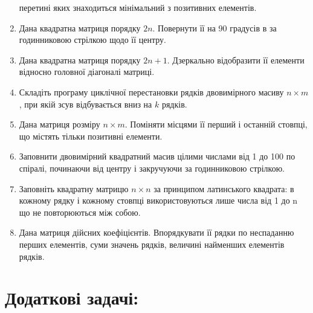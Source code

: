 \documentclass[a5paper,titlepage,openany,twoside,
]
{book_unv}%
\begin{document}
\begin{enumerate}
  перетині яких знаходиться мінімальний з позитивних елементів.
\item
  Дана квадратна матриця порядку $2n$. Повернути її на 90 градусів в
  за годинниковою стрілкою щодо її центру.
\item
  Дана квадратна матриця порядку $2n + 1$. Дзеркально відобразити її
  елементи відносно головної діагоналі матриці.
\item
  Складіть програму циклічної перестановки рядків двовимірного масиву $n \times m$,
  при якій зсув відбувається вниз на $k$ рядків.
\item
  Дана матриця розміру $n \times m$. Поміняти місцями її перший і останній
  стовпці, що містять тільки позитивні елементи.
\item
  Заповнити двовимірний квадратний масив цілими числами від 1 до 100 по
  спіралі, починаючи від центру і закручуючи за годинниковою стрілкою.
\item
  Заповніть квадратну матрицю $n \times n$ за принципом латинського квадрата: в
  кожному рядку і кожному стовпці використовуються лише числа від 1 до n
  що не повторюються між собою.
\item
  Дана матриця дійсних коефіцієнтів. Впорядкувати її рядки по неспаданню
  перших елементів, суми значень рядків, величині найменших елементів
  рядків.
\end{enumerate}

\section{Додаткові задачі:}
\end{document}

